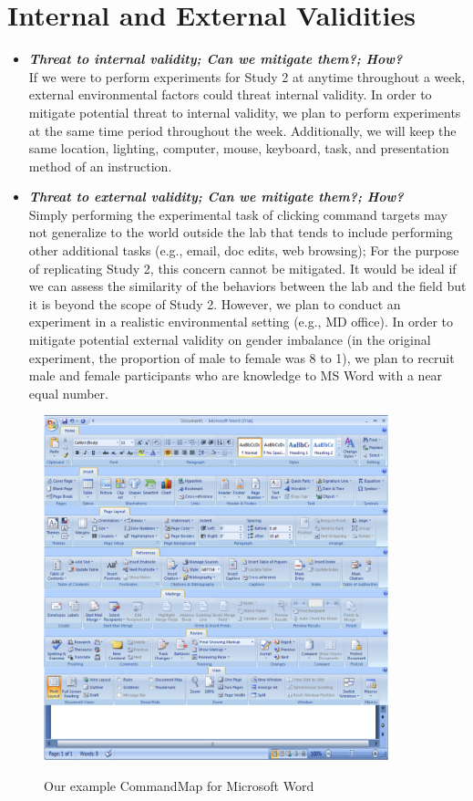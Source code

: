 \documentclass{article}
\begin{document}
\section*{Internal and External Validities}  
\begin{itemize}
   \item \textbf{\textit{Threat to internal validity; Can we mitigate them?; How?}} \\
   If we were to perform experiments for Study 2 at anytime throughout a week, external environmental factors could threat internal validity. In order to mitigate potential threat to internal validity, we plan to perform experiments at the same time period throughout the week. Additionally, we will keep the same location, lighting, computer, mouse, keyboard, task, and presentation method of an instruction. 
   \item \textbf{\textit{Threat to external validity; Can we mitigate them?; How?}} \\
   Simply performing the experimental task of clicking command targets may not generalize to the world outside the lab that tends to include performing other additional tasks (e.g., email, doc edits, web browsing); For the purpose of replicating Study 2, this concern cannot be mitigated. It would be ideal if we can assess the similarity of the behaviors between the lab and the field but it is beyond the scope of Study 2.  However, we plan to conduct an experiment in a realistic environmental setting (e.g., MD office). In order to mitigate potential external validity on gender imbalance (in the original experiment, the proportion of male to female was 8 to 1), we plan to recruit male and female participants who are knowledge to MS Word with a near equal number. 
   \end{itemize} 
   
\begin{figure}[tbh]
  \centering
  \includegraphics[width=100mm]{command_layout1}\\
  \caption{Our example CommandMap for Microsoft Word}
  \label{fig:ex_commandmap}
\end{figure}
\pagebreak
\end{document}
